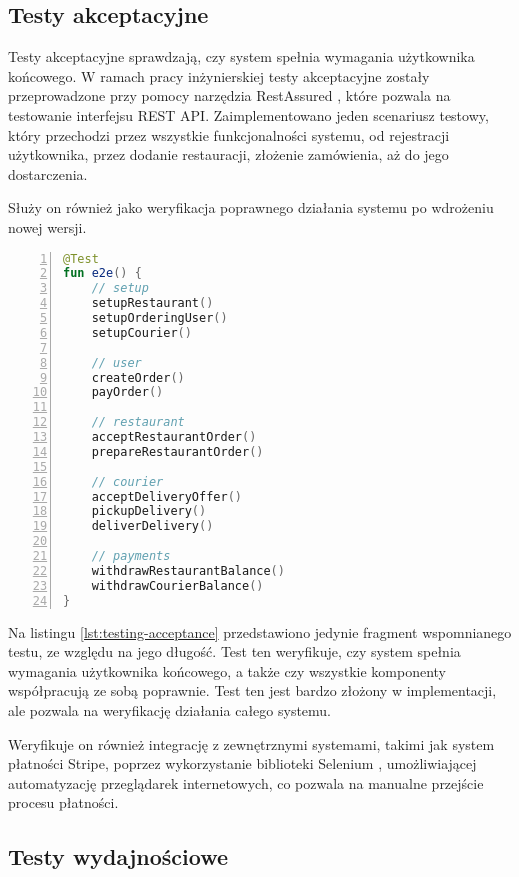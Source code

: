 \subsection{Testy akceptacyjne}

Testy akceptacyjne sprawdzają, czy system spełnia wymagania użytkownika końcowego. W ramach pracy inżynierskiej testy akceptacyjne zostały przeprowadzone przy pomocy narzędzia RestAssured \cite{restassured}, które pozwala na testowanie interfejsu REST API. Zaimplementowano jeden scenariusz testowy, który przechodzi przez wszystkie funkcjonalności systemu, od rejestracji użytkownika, przez dodanie restauracji, złożenie zamówienia, aż do jego dostarczenia.

Służy on również jako weryfikacja poprawnego działania systemu po wdrożeniu nowej wersji.

\begin{lstlisting}[caption={Scenariusz testowy w ramach testów akceptacyjnych},label={lst:testing-acceptance},captionpos=b,language=Kotlin,numbers=left]
@Test
fun e2e() {
    // setup
    setupRestaurant()
    setupOrderingUser()
    setupCourier()

    // user
    createOrder()
    payOrder()

    // restaurant
    acceptRestaurantOrder()
    prepareRestaurantOrder()

    // courier
    acceptDeliveryOffer()
    pickupDelivery()
    deliverDelivery()

    // payments
    withdrawRestaurantBalance()
    withdrawCourierBalance()
}
\end{lstlisting}

Na listingu \ref{lst:testing-acceptance} przedstawiono jedynie fragment wspomnianego testu, ze względu na jego długość. Test ten weryfikuje, czy system spełnia wymagania użytkownika końcowego, a także czy wszystkie komponenty współpracują ze sobą poprawnie. Test ten jest bardzo złożony w implementacji, ale pozwala na weryfikację działania całego systemu.

Weryfikuje on również integrację z zewnętrznymi systemami, takimi jak system płatności Stripe, poprzez wykorzystanie biblioteki Selenium \cite{selenium}, umożliwiającej automatyzację przeglądarek internetowych, co pozwala na manualne przejście procesu płatności.

\subsection{Testy wydajnościowe}

